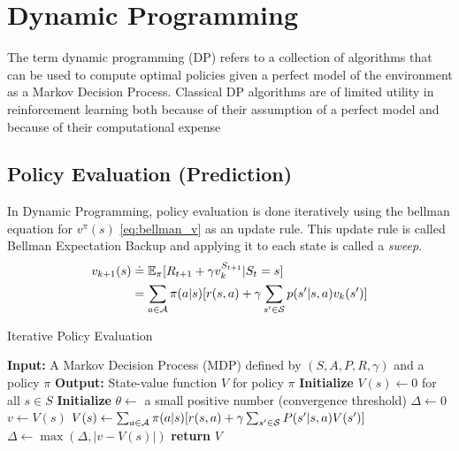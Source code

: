 \section{Dynamic Programming \label{sec:dynamic_programming}}
The term dynamic programming (DP) refers to a collection of algorithms that can be used to compute optimal policies given a perfect model
of the environment as a Markov Decision Process. Classical DP algorithms are of limited utility in reinforcement learning both because of their assumption
of a perfect model and because of their computational expense

\subsection{Policy Evaluation (Prediction)}
In Dynamic Programming, policy evaluation is done iteratively using the bellman equation for $v^\pi(s)$ \eqref{eq:bellman_v} as an update rule.
This update rule is called Bellman Expectation Backup and applying it to each state is called a \textit{sweep}.
\begin{equation*}
    \label{eq:policy_evaluation_update}
    \begin{aligned}
    v_{k+1}(s) &\doteq \mathbb{E}_\pi[R_{t+1} + \gamma v_k^{S_{t+1}} | S_t = s] \\
    &= \sum_{a \in \mathcal{A}} \pi(a|s)[r(s,a) +\gamma \sum_{s' \in \mathcal{S}} p(s'|s,a) v_k(s')]
    \end{aligned}
\end{equation*}

\begin{algorithm}[H]
    \label{alg:iterative_policy_evaluation}
    \caption{Iterative Policy Evaluation}
    \begin{algorithmic}[1]
        \STATE \textbf{Input:} A Markov Decision Process (MDP) defined by $(S, A, P, R, \gamma)$ and a policy $\pi$
        \STATE \textbf{Output:} State-value function $V$ for policy $\pi$
        \STATE \textbf{Initialize} $V(s) \gets 0$ for all $s \in S$
        \STATE \textbf{Initialize} $\theta \gets$ a small positive number (convergence threshold)
        \REPEAT
            \STATE $\Delta \gets 0$
                \STATE $v \gets V(s)$
                \STATE $V(s) \gets \sum_{a \in \mathcal{A}} \pi(a|s) [r(s,a) + \gamma \sum_{s' \in \mathcal{S}} P(s'| s, a) V(s')]$
                \STATE $\Delta \gets \max(\Delta, |v - V(s)|)$
            \ENDFOR
        \UNTIL{$\Delta < \theta$}
        \STATE \textbf{return} $V$
    \end{algorithmic}
\end{algorithm} 

